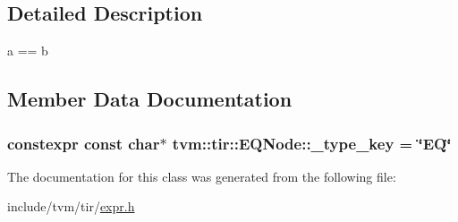 \subsection{Detailed Description}
a == b 

\subsection{Member Data Documentation}
\subsubsection[{\texorpdfstring{\+\_\+type\+\_\+key}{_type_key}}]{\setlength{\rightskip}{0pt plus 5cm}constexpr const char$\ast$ tvm\+::tir\+::\+E\+Q\+Node\+::\+\_\+type\+\_\+key = \char`\"{}EQ\char`\"{}\hspace{0.3cm}{\ttfamily [static]}}\hypertarget{classtvm_1_1tir_1_1EQNode_a4b76debb870bae97f07df7196bd4869c}{}\label{classtvm_1_1tir_1_1EQNode_a4b76debb870bae97f07df7196bd4869c}


The documentation for this class was generated from the following file\+:\begin{DoxyCompactItemize}
\item 
include/tvm/tir/\hyperlink{tir_2expr_8h}{expr.\+h}\end{DoxyCompactItemize}
